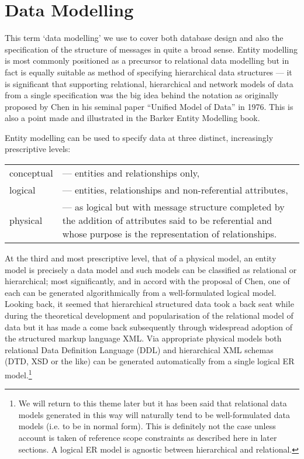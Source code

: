 \section{Data Modelling}
\label{DataModelling}
\mynote This term `data modelling' we use to cover both database design and also the specification of the structure of messages in quite a broad sense. Entity modelling is most commonly positioned as a precursor to relational data modelling but in fact is equally suitable as method of specifying hierarchical data structures --- it is significant that supporting relational, hierarchical and network models of data from a single specification was the big idea behind the notation as originally proposed by Chen in his seminal paper ``Unified Model of Data'' in 1976. 
This is also a point made and illustrated in the Barker Entity Modelling book.

\mynote Entity modelling can be used to specify data at three distinct, increasingly prescriptive levels:

\begin{tabular}{l p{8.5cm}}
conceptual &— entities and relationships only,\\
logical &— entities, relationships and non-referential attributes,\\
physical &— as logical but with message structure completed by the addition of attributes said to be referential and whose purpose is the representation of relationships.\\
\end{tabular}

At the third and most prescriptive level, that of a physical model, an entity model is precisely a data model 
 and such models can be classified as relational or hierarchical; most significantly, and in accord with the proposal of Chen, one of each can be generated algorithmically from a well-formulated logical model. 
Looking back, 
it seemed that hierarchical structured data took a back seat while during the theoretical development and popularisation of the relational model of data but it has made a come back subsequently through widespread adoption of the structured markup language XML. Via appropriate physical models both relational Data Definition Language (DDL) and hierarchical XML schemas (DTD, XSD or the like) can be generated automatically from a single logical ER model.\footnote{We will return to this theme later but it has been said that relational data models generated in this way will naturally tend to be well-formulated data models (i.e. to be in normal form). This is definitely not the case unless account is taken of reference scope constraints as described here in later sections. A logical ER model is agnostic between hierarchical and relational.}


